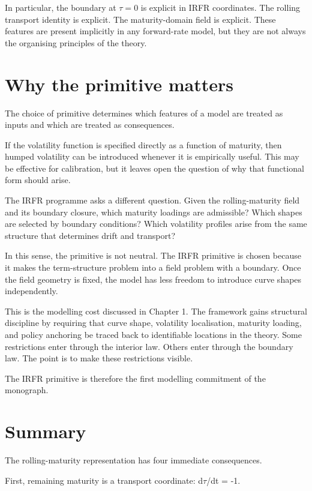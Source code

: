 \documentclass[11pt,oneside]{book}
\begin{document}
In particular, the boundary at $\tau=0$ is explicit in IRFR coordinates. The
rolling transport identity is explicit. The maturity-domain field is
explicit. These features are present implicitly in any forward-rate
model, but they are not always the organising principles of the theory.

\section{Why the primitive matters}\label{why-the-primitive-matters}

The choice of primitive determines which features of a model are treated
as inputs and which are treated as consequences.

If the volatility function is specified directly as a function of
maturity, then humped volatility can be introduced whenever it is
empirically useful. This may be effective for calibration, but it leaves
open the question of why that functional form should arise.

The IRFR programme asks a different question. Given the rolling-maturity
field and its boundary closure, which maturity loadings are admissible?
Which shapes are selected by boundary conditions? Which volatility
profiles arise from the same structure that determines drift and
transport?

In this sense, the primitive is not neutral. The IRFR primitive is
chosen because it makes the term-structure problem into a field problem
with a boundary. Once the field geometry is fixed, the model has less
freedom to introduce curve shapes independently.

This is the modelling cost discussed in Chapter 1. The framework gains
structural discipline by requiring that curve shape, volatility
localisation, maturity loading, and policy anchoring be traced back to
identifiable locations in the theory. Some restrictions enter through
the interior law. Others enter through the boundary law. The point is to
make these restrictions visible.

The IRFR primitive is therefore the first modelling commitment of the
monograph.

\section{Summary}\label{summary}

The rolling-maturity representation has four immediate consequences.

First, remaining maturity is a transport coordinate: d$\tau$/dt = -1.
\end{document}
